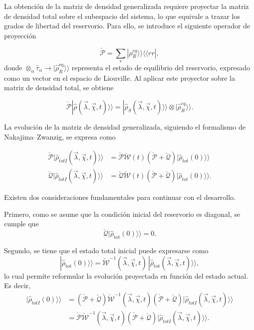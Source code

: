 \begin{appendixs}
La obtención de la matriz de densidad generalizada requiere proyectar la matriz de densidad total sobre el subespacio del sistema, lo que equivale a trazar los grados de libertad del reservorio. Para ello, se introduce el siguiente operador de proyección

\begin{equation*}
    \check{\mathcal{P}} = \sum_{r}|\rho_{R}^{eq} \rangle \rangle \langle \langle rr|,
\end{equation*}
donde \(\otimes_{\alpha} \hat{\tau}_{\alpha} \to |\hat{\rho}_{R}^{\mathrm{eq}} \rangle\rangle\) representa el estado de equilibrio del reservorio, expresado como un vector en el espacio de Liouville. Al aplicar este proyector sobre la matriz de densidad total, se obtiene

\begin{equation*}
    \check{\mathcal{P}}|\hat{\rho}(\vec{\lambda},\vec{\chi},t) \rangle \rangle = |\hat{\rho}_{S}(\vec{\lambda},\vec{\chi},t)\rangle \rangle \otimes |\hat{\rho}^{eq}_{R}\rangle \rangle .
\end{equation*}

La evolución de la matriz de densidad generalizada, siguiendo el formalismo de Nakajima–Zwanzig, se expresa como

\begin{align}
    \check{\mathcal{P}}|\hat{\rho}_{totI}(\vec{\lambda},\vec{\chi},t)\rangle \rangle & =  \check{\mathcal{P}} \check{\mathcal{W}}(t)( \check{\mathcal{P}} +  \check{\mathcal{Q}})|\hat{\rho}_{tot}(0)\rangle \rangle  \label{apendix2proyectionev1} \\
    \check{\mathcal{Q}}|\hat{\rho}_{totI}(\vec{\lambda},\vec{\chi},t)\rangle \rangle & = \check{\mathcal{Q}} \check{\mathcal{W}}(t)( \check{\mathcal{P}} +  \check{\mathcal{Q}})|\hat{\rho}_{tot}(0)\rangle \rangle. 
\label{apendix2proyectionev}
\end{align}

Existen dos consideraciones fundamentales para continuar con el desarrollo. 

Primero, como se asume que la condición inicial del reservorio es diagonal, se cumple que
\[
\check{\mathcal{Q}}|\hat{\rho}_{\mathrm{tot}}(0)\rangle\rangle = 0.
\]

Segundo, se tiene que el estado total inicial puede expresarse como
\[
|\hat{\rho}_{\mathrm{tot}}(0)\rangle\rangle = \check{\mathcal{W}}^{-1}(\vec{\lambda}, \vec{\chi}, t)\, |\hat{\rho}_{\mathrm{tot}}(\vec{\lambda}, \vec{\chi}, t)\rangle\rangle,
\]
lo cual permite reformular la evolución proyectada en función del estado actual. Es decir, 
\begin{align*}
    |\hat{\rho}_{totI}(0)\rangle \rangle & = (\check{\mathcal{P}} + \check{\mathcal{Q}} )\check{\mathcal{W}}^{-1}(\vec{\lambda},\vec{\chi},t)(\check{\mathcal{P}} + \check{\mathcal{Q}})|\hat{\rho}_{totI}(\vec{\lambda},\vec{\chi},t)\rangle \rangle \\
        & = \check{\mathcal{P}}\check{\mathcal{W}}^{-1}(\vec{\lambda},\vec{\chi},t)(\check{\mathcal{P}} + \check{\mathcal{Q}})|\hat{\rho}_{totI}(\vec{\lambda},\vec{\chi},t)\rangle \rangle.
\end{align*}


\end{appendixs}
